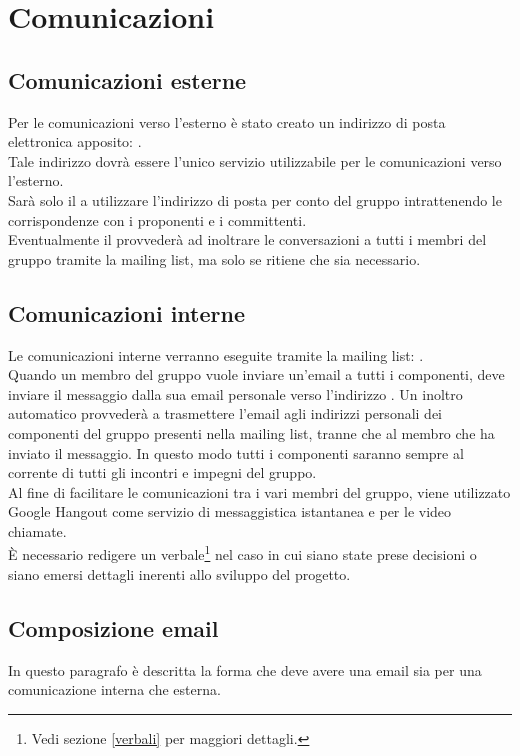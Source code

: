 \section{Comunicazioni}
\label{comunicazioni}

\subsection{Comunicazioni esterne}
\label{cesterne}
Per le comunicazioni verso l'esterno è stato creato un indirizzo di posta elettronica apposito: \email.
\\Tale indirizzo dovrà essere l'unico servizio utilizzabile per le comunicazioni verso l'esterno.
\\Sarà solo il \projectManager{} a utilizzare l'indirizzo di posta
 per conto del gruppo \authorName{} intrattenendo le corrispondenze con i proponenti e i committenti.
\\Eventualmente il \projectManager{} provvederà ad inoltrare le conversazioni a tutti i membri del gruppo tramite la mailing list\glossario{}, ma solo se ritiene che sia necessario.

\subsection{Comunicazioni interne}
\label{cinterne}
Le comunicazioni interne verranno eseguite tramite la mailing list\glossario{}: \email.
\\Quando un membro del gruppo vuole inviare un'email a tutti i componenti, deve inviare il messaggio dalla sua email personale verso l'indirizzo \email{}. Un inoltro automatico provvederà a trasmettere l'email agli indirizzi personali dei componenti del gruppo presenti nella mailing list\glossario{}, tranne che al membro che ha inviato il messaggio. In questo modo tutti i componenti saranno sempre al corrente di tutti gli incontri e impegni del gruppo.
\\Al fine di facilitare le comunicazioni tra i vari membri del gruppo,
 viene utilizzato Google Hangout\glossario{} come servizio di messaggistica istantanea e per le video chiamate.
\\È necessario redigere un verbale\footnote{Vedi sezione \ref{verbali} per maggiori dettagli.} nel caso in cui siano state prese decisioni o siano emersi dettagli inerenti allo sviluppo del progetto.

\subsection{Composizione email}
\label{composizione}
In questo paragrafo è descritta la forma che deve avere una email sia per una comunicazione interna che esterna.

